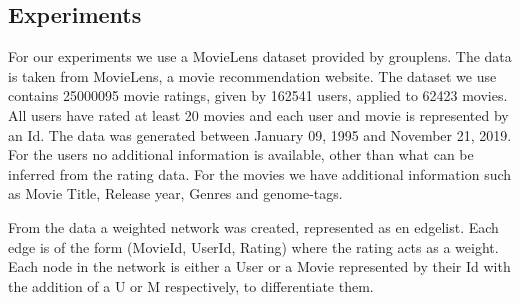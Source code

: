 \subsection{Experiments}
For our experiments we use a MovieLens dataset provided by grouplens\cite{Grouplensdata}. The data is taken from MovieLens, a movie recommendation website. The dataset we use contains 25000095 movie ratings, given by 162541 users, applied to 62423 movies. All users have rated at least 20 movies and each user and movie is represented by an Id. The data was generated between January 09, 1995 and November 21, 2019. For the users no additional information is available, other than what can be inferred from the rating data. For the movies we have additional information such as Movie Title, Release year, Genres and genome-tags.

From the data a weighted network was created, represented as en edgelist. Each edge is of the form (MovieId, UserId, Rating) where the rating acts as a weight. Each node in the network is either a User or a Movie represented by their Id with the addition of a U or M respectively, to differentiate them.
